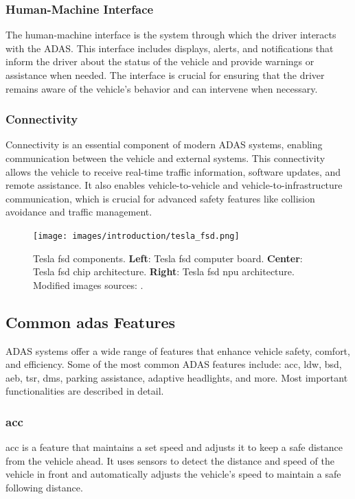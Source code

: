 \subsubsection*{Human-Machine Interface}
The human-machine interface is the system through which the driver interacts 
with the ADAS. This interface includes displays, alerts, and notifications that 
inform the driver about the status of the vehicle and provide warnings or 
assistance when needed. The interface is crucial for ensuring that the driver 
remains aware of the vehicle's behavior and can intervene when necessary.

\subsubsection*{Connectivity}
Connectivity is an essential component of modern ADAS systems, enabling 
communication between the vehicle and external systems. This connectivity allows 
the vehicle to receive real-time traffic information, software updates, and 
remote assistance. It also enables vehicle-to-vehicle and vehicle-to-infrastructure 
communication, which is crucial for advanced safety features like collision 
avoidance and traffic management.

\begin{figure}
    \centering
    \texttt{[image: images/introduction/tesla\_fsd.png]}
    \caption[Tesla \acs{fsd} computer board and chip architecture]
    {Tesla \acf{fsd} components.
    \textbf{Left}: Tesla \acs{fsd} computer board.
    \textbf{Center}: Tesla \acs{fsd} chip architecture.
    \textbf{Right}: Tesla \acs{fsd} \acf{npu} architecture.
    Modified images sources: 
    \cites{wikichip_2024_tesla_fsd_computer_board}{wikichip_2024_tesla_fsd_chip}{wikichip_2024_tesla_fsd_npu}.}
    \label{fig:adas_fsd}
\end{figure}

\subsection{Common \acs{adas} Features}
ADAS systems offer a wide range of features that enhance vehicle safety, 
comfort, and efficiency. Some of the most common ADAS features include: 
\ac*{acc}, \ac*{ldw}, \ac*{bsd}, \ac*{aeb}, \ac*{tsr}, \ac*{dms}, parking assistance,
adaptive headlights, and more. Most important functionalities are described in detail.

\subsubsection*{\ac{acc}}
\ac{acc} is a feature that maintains a set speed and adjusts it to keep a safe 
distance from the vehicle ahead. It uses sensors to detect the distance and 
speed of the vehicle in front and automatically adjusts the vehicle's speed to
maintain a safe following distance.

